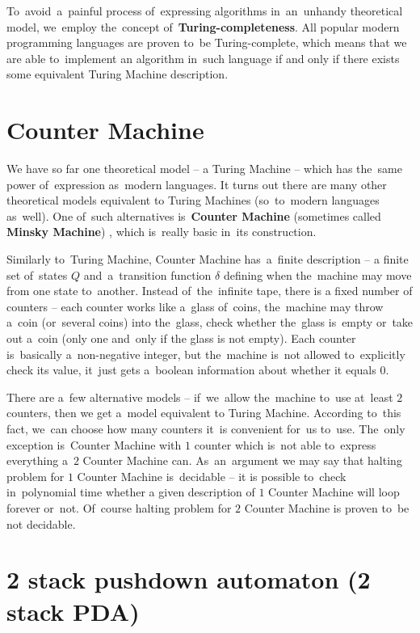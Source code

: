 \documentclass[english,shortabstract,mgr]{iithesis}
\begin{document}
To~avoid~a~painful process of~expressing algorithms in~an~unhandy theoretical model, we~employ
the~concept of~\textbf{Turing-completeness}. All popular modern programming languages are proven
to~be Turing-complete, which means that we are able to~implement an algorithm in~such
language if and only if there exists some equivalent Turing Machine description.

\section{Counter Machine}

We have so far one theoretical model -- a Turing Machine -- which has the~same power of~expression
as~modern languages. It turns out there are many other theoretical models
equivalent to Turing Machines (so~to~modern languages as~well). One of~such alternatives
is~\textbf{Counter Machine} (sometimes called \textbf{Minsky Machine}) \cite{minsky_67},
which is~really basic in~its construction.

Similarly to~Turing Machine, Counter Machine has~a~finite description -- a finite set of~states $Q$
and~a~transition function $\delta$ defining when the~machine may move from one state to~another.
Instead of~the~infinite tape, there is a fixed number of counters -- each counter works like a~glass of~coins,
the~machine may throw a~coin (or~several coins) into the~glass, check whether the~glass is~empty
or~take out a~coin (only one and~only if the glass is not empty). Each counter is~basically a~non-negative
integer, but the~machine is~not allowed to~explicitly check its value, it~just gets a~boolean
information about whether it equals $0$.

There are a~few alternative models -- if~we~allow the~machine to~use at~least $2$ counters,
then we get a~model equivalent to Turing Machine. According to~this fact, we~can
choose how many counters it~is convenient for~us to~use. The~only exception is~Counter Machine with
$1$ counter which is~not able to~express everything a~$2$ Counter Machine can. As~an~argument
we may say that halting problem for $1$ Counter Machine is~decidable -- it is possible to~check
in~polynomial time whether a given description of $1$ Counter Machine will loop forever or~not.
Of~course halting problem for $2$ Counter Machine is proven to~be not decidable. \cite{minsky_67}

\section {2 stack pushdown automaton (2 stack PDA)}
\end{document}

